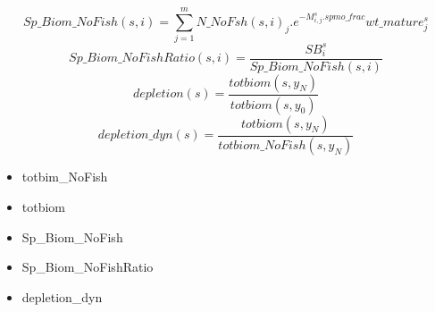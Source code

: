 \documentclass{article}
\begin{document}
\begin{equation}
Sp\_Biom\_NoFish(s,i)=\sum_{j=1}^m N\_NoFsh(s,i)_j.e^{-M^s_{i,j}.spmo\_frac}wt\_mature^s_j
\end{equation}
\begin{equation}
    Sp\_Biom\_NoFishRatio(s,i)=\dfrac{SB^s_i}{Sp\_Biom\_NoFish(s,i)}
\end{equation}
\begin{equation}
    depletion(s)=\dfrac{totbiom(s,y_N)}{totbiom(s,y_0)}
\end{equation}
\begin{equation}
    depletion\_dyn(s)=\dfrac{totbiom(s,y_N)}{totbiom\_NoFish(s,y_N)}
\end{equation}
\begin{itemize}
    \item totbim\_NoFish
    \item totbiom
    \item Sp\_Biom\_NoFish
    \item Sp\_Biom\_NoFishRatio
    \item depletion\_dyn
\end{itemize}
\end{document}
